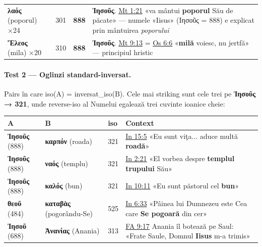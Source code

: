 \documentclass[12pt,a4paper,twoside,openany]{book}
\begin{document}
\begin{center}
\begin{tabular}{L{2.6cm}C{1cm}C{1.5cm}L{7.6cm}}
\textbf{λαός} (poporul) ×24 & 301 & \textbf{888} & \textbf{Ἰησοῦς}. \href{https://bibliaortodoxa.ro/carte.php?id=55\&cap=1\#21}{Mt 1:21} «va mântui \textbf{poporul} Său de păcate» --- numele «Iisus» (Ιησοῦς = 888) e explicat prin mântuirea \textit{poporului} \\
\textbf{Ἔλεος} (mila) ×20 & 310 & \textbf{888} & \textbf{Ἰησοῦς}. \href{https://bibliaortodoxa.ro/carte.php?id=55\&cap=9\#13}{Mt 9:13} = \href{https://bibliaortodoxa.ro/carte.php?id=28\&cap=6\#6}{Os 6:6} «\textbf{milă} voiesc, nu jertfă» --- principiul hristic \\
\bottomrule
\end{tabular}
\end{center}

\paragraph*{Test 2 --- Oglinzi standard-inversat.} Pairs în care iso(A) = inversat\_iso(B). Cele mai striking sunt cele trei pe \textbf{Ἰησοῦς → 321}, unde reverse-iso al Numelui egalează trei cuvinte ioanice cheie:

\begin{center}
\footnotesize
\begin{tabular}{L{2.8cm}L{2.8cm}C{1.5cm}L{6.5cm}}
\toprule
{}
\textbf{A} & \textbf{B} & \textbf{iso} & \textbf{Context} \\
\midrule
\textbf{Ἰησοῦς} (888) & \textbf{καρπόν} (roada) & 321 & \href{https://bibliaortodoxa.ro/carte.php?id=35\&cap=15\#5}{In 15:5} «Eu sunt viţa... aduce multă \textbf{roadă}» \\
\textbf{Ἰησοῦς} (888) & \textbf{ναός} (templu) & 321 & \href{https://bibliaortodoxa.ro/carte.php?id=35\&cap=2\#21}{In 2:21} «El vorbea despre \textbf{templul trupului} Său» \\
\textbf{Ἰησοῦς} (888) & \textbf{καλός} (bun) & 321 & \href{https://bibliaortodoxa.ro/carte.php?id=35\&cap=10\#11}{In 10:11} «Eu sunt păstorul cel \textbf{bun}» \\
\textbf{θεοῦ} (484) & \textbf{καταβὰς} (pogorându-Se) & 525 & \href{https://bibliaortodoxa.ro/carte.php?id=35\&cap=6\#33}{In 6:33} «Pâinea lui Dumnezeu este Cea care \textbf{Se pogoară} din cer» \\
\textbf{Ἰησοῦ} (688) & \textbf{Ἁνανίας} (Anania) & 313 & \href{https://bibliaortodoxa.ro/carte.php?id=51\&cap=9\#17}{FA 9:17} Anania îl botează pe Saul: «Frate Saule, Domnul \textbf{Iisus} m-a trimis» \\
\bottomrule
\end{tabular}
\end{center}
\end{document}
